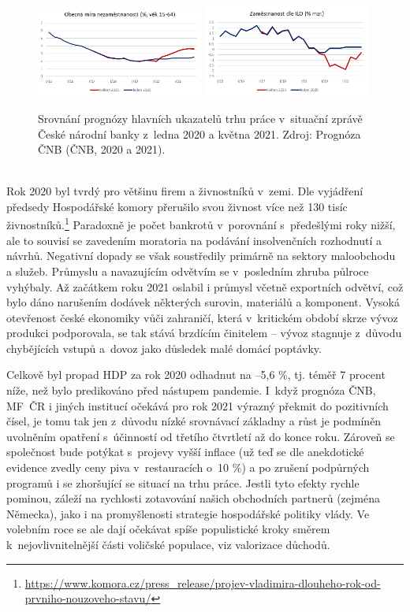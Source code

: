 \begin{figure}[ht]
    \centering
    \includegraphics[width=0.49\textwidth]{./pic/nezamestnanost.png} \includegraphics[width=0.49\textwidth]{./pic/zamestnanost.png}
    \caption{Srovnání prognózy hlavních ukazatelů trhu práce v~situační zprávě České národní banky z~ledna 2020 a května 2021. Zdroj: Prognóza ČNB (ČNB, 2020 a 2021).}
    \label{fig:110-trhprace}
\end{figure}
\\Rok 2020 byl tvrdý pro většinu firem a živnostníků v~zemi. Dle vyjádření předsedy Hospodářské komory přerušilo svou živnost více než 130 tisíc živnostníků.\footnote{\url{https://www.komora.cz/press_release/projev-vladimira-dlouheho-rok-od-prvniho-nouzoveho-stavu/}} Paradoxně je počet bankrotů v~porovnání s~předešlými roky nižší, ale to souvisí se zavedením moratoria na podávání insolvenčních rozhodnutí a návrhů. Negativní dopady se však soustředily primárně na sektory maloobchodu a služeb. Průmyslu a navazujícím odvětvím se v~posledním zhruba půlroce vyhýbaly. Až začátkem roku 2021 oslabil i průmysl včetně exportních odvětví, což bylo dáno narušením dodávek některých surovin, materiálů a komponent. Vysoká otevřenost české ekonomiky vůči zahraničí, která v~kritickém období skrze vývoz produkci podporovala, se tak stává brzdícím činitelem – vývoz stagnuje z~důvodu chybějících vstupů a~dovoz jako důsledek malé domácí poptávky.

Celkově byl propad HDP za rok 2020 odhadnut na --5,6 \%, tj. téměř 7 procent níže, než bylo predikováno před nástupem pandemie. I~když prognóza ČNB, MF~ČR i jiných institucí očekává pro rok 2021 výrazný překmit do pozitivních čísel, je tomu tak jen z~důvodu nízké srovnávací základny a růst je podmíněn uvolněním opatření s~účinností od třetího čtvrtletí až do konce roku. Zároveň se společnost bude potýkat s~projevy vyšší inflace (už teď se dle anekdotické evidence zvedly ceny piva v~restauracích o~10 \%) a po zrušení podpůrných programů i se zhoršující se situací na trhu práce. Jestli tyto efekty rychle pominou, záleží na rychlosti zotavování našich obchodních partnerů (zejména Německa), jako i na promyšlenosti strategie hospodářské politiky vlády. Ve volebním roce se ale dají očekávat spíše populistické kroky směrem k~nejovlivnitelnější části voličské populace, viz valorizace důchodů.

